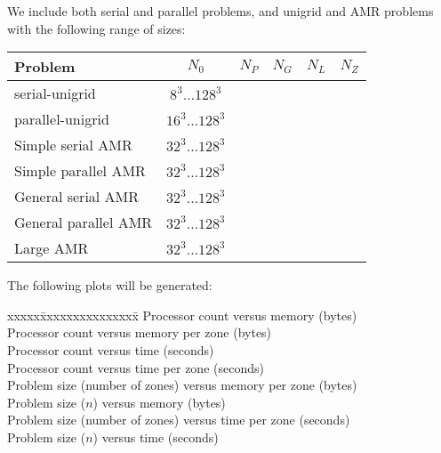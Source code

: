 \documentclass[10pt]{article}
\begin{document}
We include both serial and parallel problems, and unigrid and AMR problems with
the following range of sizes:

\begin{tabular}{l|ccccc} \\
Problem & $N_0$ & $N_P$ & $N_G$ & $N_L$ & $N_Z$ \\ \hline
serial-unigrid       & $8^3\ldots 128^3$ & & & \\
parallel-unigrid     & $16^3\ldots 128^3$ & & & \\
Simple serial AMR    & $32^3\ldots 128^3$ & & & \\
Simple parallel AMR  & $32^3\ldots 128^3$ & & & \\
General serial AMR   & $32^3\ldots 128^3$ & & & \\
General parallel AMR & $32^3\ldots 128^3$ & & & \\
Large AMR            & $32^3\ldots 128^3$ & & & \\
\end{tabular}

The following plots will be generated:

\begin{tabbing}
xxxxx\=xxxxxxxxxxxxxxx\=\kill
\>   \> Processor count versus memory (bytes) \\
\> \> Processor count versus memory per zone (bytes) \\
\> \> Processor count versus time (seconds) \\
\> \> Processor count versus time per zone (seconds) \\
\> \>  Problem size (number of zones) versus memory per zone (bytes) \\
\> \>  Problem size ($n$) versus memory (bytes) \\
\> \>  Problem size (number of zones) versus time per zone (seconds) \\
\> \>  Problem size ($n$) versus time (seconds)
\end{tabbing}

\EndDOCUMENT
\end{document}
